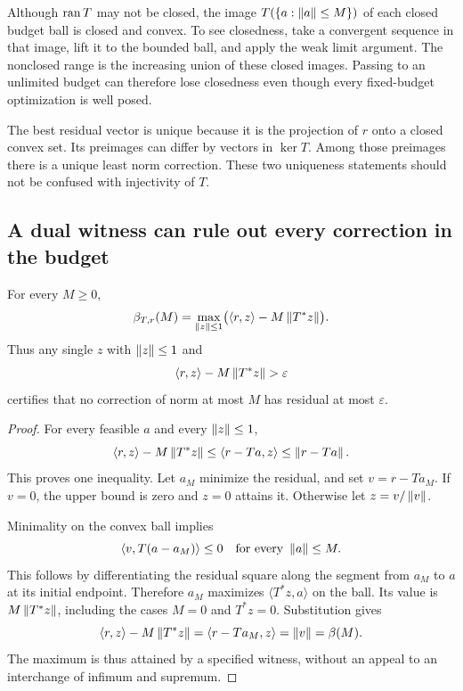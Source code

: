 Although $\operatorname{ran} T$ may not be closed, the image $T(\{a:\left\lVert a\right\rVert\le M\})$ of each closed budget ball is closed and convex. To see closedness, take a convergent sequence in that image, lift it to the bounded ball, and apply the weak limit argument. The nonclosed range is the increasing union of these closed images. Passing to an unlimited budget can therefore lose closedness even though every fixed-budget optimization is well posed.

The best residual vector is unique because it is the projection of $r$ onto a closed convex set. Its preimages can differ by vectors in $\ker T$. Among those preimages there is a unique least norm correction. These two uniqueness statements should not be confused with injectivity of $T$.

\subsection{A dual witness can rule out every correction in the budget}
\begin{theorem}\label{WR04}
For every $M\ge0$,
\begin{equation}\label{eq:budget-dual}
 \beta_{T,r}(M)=
 \max_{\left\lVert z\right\rVert\le1}\bigl(\langle r,z\rangle-M\left\lVert T^*z\right\rVert\bigr).
\end{equation}
Thus any single $z$ with $\left\lVert z\right\rVert\le1$ and
\[
 \langle r,z\rangle-M\left\lVert T^*z\right\rVert>\varepsilon
\]
certifies that no correction of norm at most $M$ has residual at most $\varepsilon$.
\end{theorem}
\begin{proof}
For every feasible $a$ and every $\left\lVert z\right\rVert\le1$,
\[
 \langle r,z\rangle-M\left\lVert T^*z\right\rVert
 \le\langle r-Ta,z\rangle\le\left\lVert r-Ta\right\rVert.
\]
This proves one inequality. Let $a_M$ minimize the residual, and set $v=r-Ta_M$. If $v=0$, the upper bound is zero and $z=0$ attains it. Otherwise let $z=v/\left\lVert v\right\rVert$.

Minimality on the convex ball implies
\[
 \langle v,T(a-a_M)\rangle\le0
 \quad\text{for every }\left\lVert a\right\rVert\le M.
\]
This follows by differentiating the residual square along the segment from $a_M$ to $a$ at its initial endpoint. Therefore $a_M$ maximizes $\langle T^*z,a\rangle$ on the ball. Its value is $M\left\lVert T^*z\right\rVert$, including the cases $M=0$ and $T^*z=0$. Substitution gives
\[
 \langle r,z\rangle-M\left\lVert T^*z\right\rVert
 =\langle r-Ta_M,z\rangle=\left\lVert v\right\rVert=\beta(M).
\]
The maximum is thus attained by a specified witness, without an appeal to an interchange of infimum and supremum.
\end{proof}

